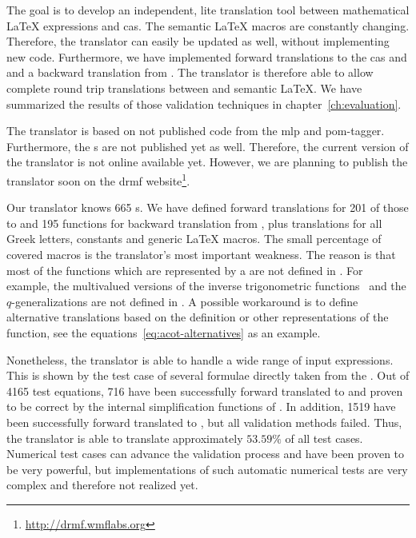 The goal is to develop an independent, lite translation tool between mathematical \LaTeX{} expressions and \gls{cas}. The semantic \LaTeX{} macros are constantly changing. Therefore, the translator can easily be updated as well, without implementing new code. Furthermore, we have implemented forward translations to the \gls{cas} \Maple{} and \Mathematica{} and a backward translation from \Maple. The translator is therefore able to allow complete round trip translations between \Maple{} and semantic \LaTeX. We have summarized the results of those validation techniques in chapter~\ref{ch:evaluation}.

The translator is based on not published code from the \gls{mlp} and \gls{pom}-tagger. Furthermore, the \Macro s are not published yet as well. Therefore, the current version of the translator is not online available yet. However, we are planning to publish the translator soon on the \gls{drmf} website\footnote{\url{http://drmf.wmflabs.org}}.

Our translator knows 665 \Macro s. We have defined forward translations for 201 of those to \Maple{} and 195 functions for backward translation from \Maple, plus translations for all Greek letters, constants and generic \LaTeX{} macros. The small percentage of covered macros is the translator's most important weakness. The reason is that most of the functions which are represented by a \Macro{} are not defined in \Maple. For example, the multivalued versions of the inverse trigonometric functions~\cite[(4.23.1-6)]{NIST:DLMF} and the $q$-generalizations are not defined in \Maple. A possible workaround is to define alternative translations based on the definition or other representations of the function, see the equations~\ref{eq:acot-alternatives} as an example. 

Nonetheless, the translator is able to handle a wide range of input expressions. This is shown by the test case of several formulae directly taken from the \DLMF. Out of 4165 test equations, 716 have been successfully forward translated to \Maple{} and proven to be correct by the internal simplification functions of \Maple. In addition, 1519 have been successfully forward translated to \Maple, but all validation methods failed. Thus, the translator is able to translate approximately $53.59\%$ of all test cases. Numerical test cases can advance the validation process and have been proven to be very powerful, but implementations of such automatic numerical tests are very complex and therefore not realized yet.
\newpage

